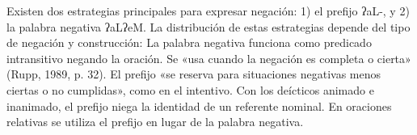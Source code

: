 Existen dos estrategias principales para expresar negación: 1) el prefijo {\setmainfont{Doulos SIL}ʔaL-}, y 2) la palabra negativa {\setmainfont{Doulos SIL}ʔaLʔeM}. La distribución de estas estrategias depende del tipo de negación y construcción: La palabra negativa funciona como predicado intransitivo negando la oración. Se «usa cuando la negación es completa o cierta» (Rupp, 1989, p. 32). El prefijo «se reserva para situaciones negativas menos ciertas o no cumplidas», como en el intentivo. Con los deícticos animado e inanimado, el prefijo niega la identidad de un referente nominal. En oraciones relativas se utiliza el prefijo en lugar de la palabra negativa.